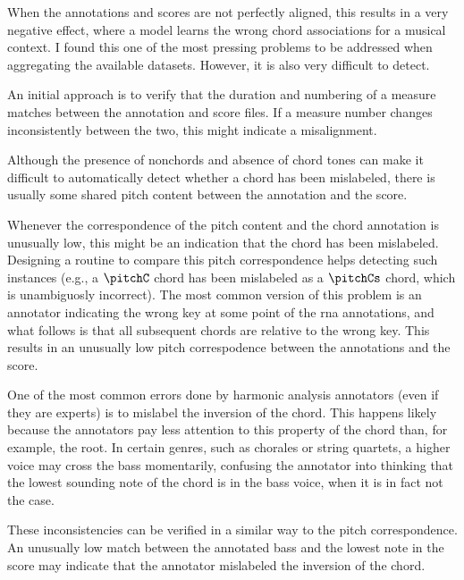 



When the annotations and scores are not perfectly aligned,
this results in a very negative effect, where a model learns
the wrong chord associations for a musical context. I found
this one of the most pressing problems to be addressed when
aggregating the available datasets. However, it is also very
difficult to detect.

An initial approach is to verify that the duration and
numbering of a measure matches between the annotation and
score files. If a measure number changes inconsistently
between the two, this might indicate a misalignment.


Although the presence of \gls{nonchord}s and absence of
chord tones can make it difficult to automatically detect
whether a chord has been mislabeled, there is usually some
shared pitch content between the annotation and the score.

Whenever the correspondence of the pitch content and the
chord annotation is unusually low, this might be an
indication that the chord has been mislabeled. Designing a
routine to compare this pitch correspondence helps detecting
such instances (e.g., a $\pitchC$ chord has been mislabeled
as a $\pitchCs$ chord, which is unambiguosly incorrect). The
most common version of this problem is an annotator
indicating the wrong key at some point of the \gls{rna}
annotations, and what follows is that all subsequent chords
are relative to the wrong key. This results in an unusually
low pitch correspodence between the annotations and the
score.



One of the most common errors done by harmonic analysis
annotators (even if they are experts) is to mislabel the
inversion of the chord. This happens likely because the
annotators pay less attention to this property of the chord
than, for example, the root. In certain genres, such as
chorales or string quartets, a higher voice may cross the
bass momentarily, confusing the annotator into thinking that
the lowest sounding note of the chord is in the bass voice,
when it is in fact not the case.

These inconsistencies can be verified in a similar way to
the pitch correspondence. An unusually low match between the
annotated bass and the lowest note in the score may indicate
that the annotator mislabeled the inversion of the chord.
